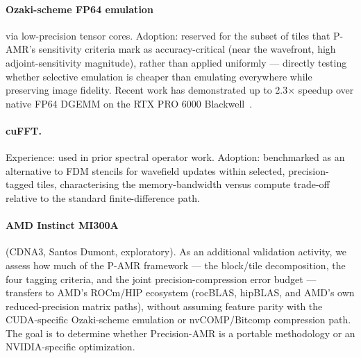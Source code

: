 \documentclass[12pt,a4paper]{article}
\newcommand{\pamr}{P\nobreakdash-AMR}
\begin{document}
\paragraph{Ozaki-scheme FP64 emulation} via low-precision tensor cores.
Adoption: reserved for the subset of tiles that \pamr{}'s sensitivity criteria
mark as accuracy-critical (near the wavefront, high adjoint-sensitivity
magnitude), rather than applied uniformly --- directly testing whether selective
emulation is cheaper than emulating everywhere while preserving image fidelity.
Recent work has demonstrated up to 2.3$\times$ speedup over native FP64 DGEMM on
the RTX PRO 6000 Blackwell~\cite{uchino2025ozaki}.

\paragraph{cuFFT.} Experience: used in prior spectral operator work. Adoption:
benchmarked as an alternative to FDM stencils for wavefield updates within
selected, precision-tagged tiles, characterising the memory-bandwidth versus
compute trade-off relative to the standard finite-difference path.

\paragraph{AMD Instinct MI300A} (CDNA3, Santos Dumont, exploratory). As an
additional validation activity, we assess how much of the \pamr{} framework ---
the block/tile decomposition, the four tagging criteria, and the joint
precision-compression error budget --- transfers to AMD's ROCm/HIP ecosystem
(rocBLAS, hipBLAS, and AMD's own reduced-precision matrix paths), without
assuming feature parity with the CUDA-specific Ozaki-scheme emulation or
nvCOMP/Bitcomp compression path. The goal is to determine whether Precision-AMR
is a portable methodology or an NVIDIA-specific optimization.

\fi

\iffalse
\end{document}
